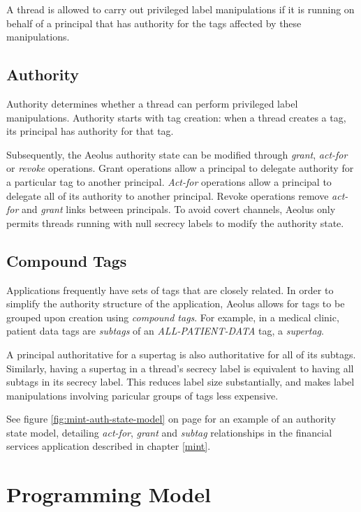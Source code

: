 \noindent
A thread is allowed to carry out privileged label manipulations if it is running on behalf of a principal that has authority for the tags affected by these manipulations.

\subsection{Authority}\label{auth}

Authority determines whether a thread can perform privileged label manipulations. Authority starts with tag creation: when a thread creates a tag, its principal has authority for that tag.

Subsequently, the Aeolus authority state can be modified through \emph{grant}, \emph{act-for} or \emph{revoke} operations. Grant operations allow a principal to delegate authority for a particular tag to another principal. \emph{Act-for} operations allow a principal to delegate all of its authority to another principal. Revoke operations remove \emph{act-for} and \emph{grant} links between principals. To avoid covert channels, Aeolus only permits threads running with null secrecy labels to modify the authority state.

\subsection{Compound Tags}

Applications frequently have sets of tags that are closely related. In order to simplify the authority structure of the application, Aeolus allows for tags to be grouped upon creation using \emph{compound tags}. For example, in a medical clinic, patient data tags are \emph{subtags} of an \emph{ALL-PATIENT-DATA} tag, a \emph{supertag}.

A principal authoritative for a supertag is also authoritative for all of its subtags. Similarly, having a supertag in a thread's secrecy label is equivalent to having all subtags in its secrecy label. This reduces label size substantially, and makes label manipulations involving paricular groups of tags less expensive.


See figure \ref{fig:mint-auth-state-model} on page \pageref{fig:mint-auth-state-model} for an example of an authority state model, detailing \emph{act-for}, \emph{grant} and \emph{subtag} relationships in the financial services application described in chapter \ref{mint}.

\section{Programming Model}

